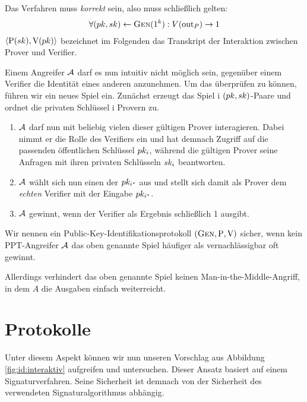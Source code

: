 Das Verfahren muss \emph{korrekt} sein, also muss schließlich gelten:
\begin{align*}
\forall (pk, sk) \leftarrow \textsc{Gen}(1^k): V(\mathrm{out}_P) \rightarrow 1
\end{align*}
$\langle \mathrm{P}(sk), \mathrm{V}(pk) \rangle$ bezeichnet im Folgenden das Transkript der Interaktion zwischen Prover und Verifier.

Einem Angreifer $\mathcal{A}$ darf es nun intuitiv nicht möglich sein, gegenüber einem Verifier die Identität eines anderen anzunehmen. Um das
überprüfen zu können, führen wir ein neues Spiel ein. Zunächst erzeugt das Spiel i $(pk, sk)$-Paare und ordnet die privaten
Schlüssel i Provern zu.
\begin{enumerate}
  \item $\mathcal{A}$ darf nun mit beliebig vielen dieser gültigen Prover interagieren. Dabei nimmt er die Rolle des Verifiers ein und hat
  demnach Zugriff auf die passenden öffentlichen Schlüssel $pk_i$, während die gültigen Prover seine Anfragen mit ihren
  privaten Schlüsseln $sk_i$ beantworten.
  \item $\mathcal{A}$ wählt sich nun einen der $pk_{i^*}$ aus und stellt sich damit als Prover dem \emph{echten} Verifier mit der Eingabe
  $pk_{i^*}$.
  \item $\mathcal{A}$ gewinnt, wenn der Verifier als Ergebnis schließlich 1 ausgibt.
\end{enumerate}
Wir nennen ein Public-Key-Identifikationsprotokoll $(\textsc{Gen}, \mathrm{P}, \mathrm{V})$ sicher, wenn kein PPT-Angreifer $\mathcal{A}$ das oben
genannte Spiel häufiger als vernachlässigbar oft gewinnt.

Allerdings verhindert das oben genannte Spiel keinen Man-in-the-Middle-Angriff, in dem $A$ die Ausgaben einfach weiterreicht.


\section{Protokolle}
Unter diesem Aspekt können wir nun unseren Vorschlag aus Abbildung \ref{fig:id:interaktiv} aufgreifen und untersuchen. Dieser Ansatz basiert auf einem
Signaturverfahren. Seine Sicherheit ist demnach von der Sicherheit des verwendeten Signaturalgorithmus abhängig.~\\


